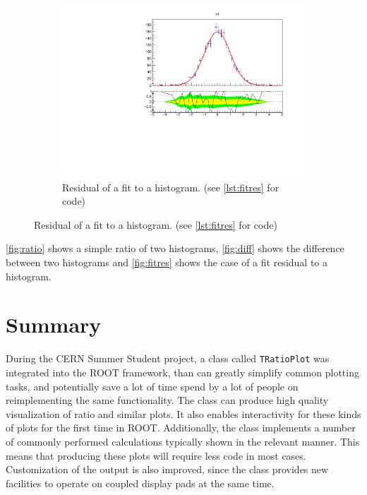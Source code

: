 \begin{figure}
\begin{subfigure}{0.5\linewidth}
    \includegraphics[width=1.0\linewidth]{assets/single.pdf} 
    \caption{Residual of a fit to a histogram. (see \autoref{lst:fitres} for code)}
    \label{fig:fitres}
  \end{subfigure}
\end{figure}

\autoref{fig:ratio} shows a simple ratio of two histograms, \autoref{fig:diff} shows the difference
between two histograms and \autoref{fig:fitres} shows the case of a fit residual to a histogram.

\section{Summary}
During the CERN Summer Student project, a class called \texttt{TRatioPlot} was integrated into
the ROOT framework, than can greatly simplify common plotting tasks, and potentially save a lot
of time spend by a lot of people on reimplementing the same functionality. The class can produce
high quality visualization of ratio and similar plots. It also enables interactivity for these
kinds of plots for the first time in ROOT. Additionally, the class implements a number of 
commonly performed calculations typically shown in the relevant manner. This means that producing
these plots will require less code in most cases. Customization of the output is also improved,
since the class provides new facilities to operate on coupled display pads at the same time.

\clearpage

